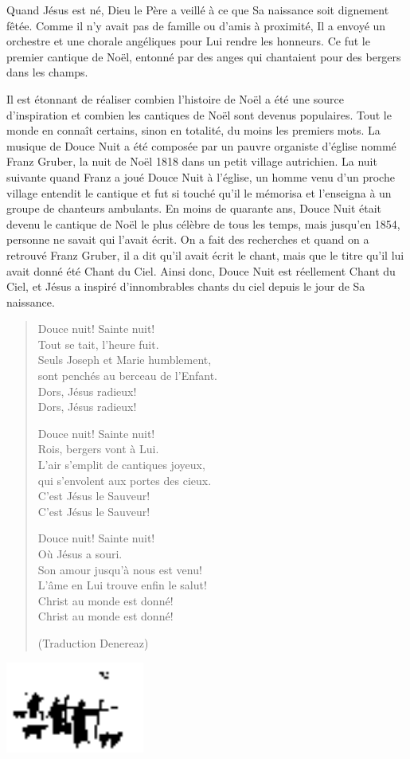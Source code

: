 


Quand Jésus est né, Dieu le Père a veillé à ce que Sa naissance soit dignement fêtée. Comme il n'y avait pas de famille ou d'amis à proximité, Il a envoyé un orchestre et une chorale angéliques pour Lui rendre les honneurs. Ce fut le premier cantique de Noël, entonné par des anges qui chantaient pour des bergers dans les champs.

Il est étonnant de réaliser combien l'histoire de Noël a été une source d'inspiration et combien les cantiques de Noël sont devenus populaires. Tout le monde en connaît certains, sinon en totalité, du moins les premiers mots. La musique de Douce Nuit a été composée par un pauvre organiste d'église nommé Franz Gruber, la nuit de Noël 1818 dans un petit village autrichien. La nuit suivante quand Franz a joué Douce Nuit à l'église, un homme venu d'un proche village entendit le cantique et fut si touché qu'il le mémorisa et l'enseigna à un groupe de chanteurs ambulants. En moins de quarante ans, Douce Nuit était devenu le cantique de Noël le plus célèbre de tous les temps, mais jusqu'en 1854, personne ne savait qui l'avait écrit. On a fait des recherches et quand on a retrouvé Franz Gruber, il a dit qu'il avait écrit le chant, mais que le titre qu'il lui avait donné été Chant du Ciel. Ainsi donc, Douce Nuit est réellement Chant du Ciel, et Jésus a inspiré d'innombrables chants du ciel depuis le jour de Sa naissance. 


\begin{verse}
Douce nuit! Sainte nuit!\\
Tout se tait, l'heure fuit.\\
Seuls Joseph et Marie humblement,\\
sont penchés au berceau de l'Enfant.\\
Dors, Jésus radieux!\\
Dors, Jésus radieux!

Douce nuit! Sainte nuit!\\
Rois, bergers vont à Lui.\\
L'air s'emplit de cantiques joyeux,\\
qui s'envolent aux portes des cieux.\\
C'est Jésus le Sauveur!\\
C'est Jésus le Sauveur!

Douce nuit! Sainte nuit!\\
Où Jésus a souri.\\
Son amour jusqu'à nous est venu!\\
L'âme en Lui trouve enfin le salut!\\
Christ au monde est donné!\\
Christ au monde est donné!

(Traduction Denereaz)
\end{verse}


\mbox{}\hfill\includegraphics[height=3cm]{images/shepherds.png}\hfill\mbox{}

